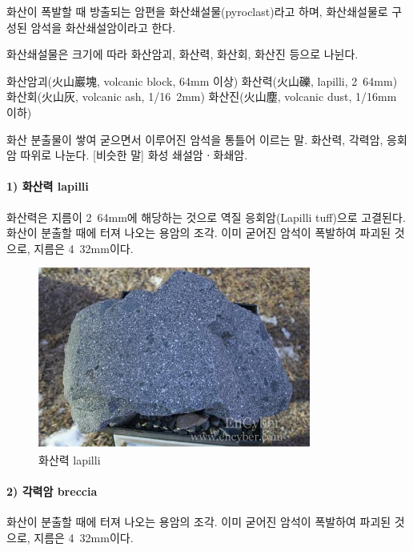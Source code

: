 \documentclass[12pt, a4paper, twoside]{book}
\begin{document}
			화산이 폭발할 때 방출되는 암편을 화산쇄설물(pyroclast)라고 하며, 화산쇄설물로 구성된 암석을 화산쇄설암이라고 한다. 
			
			화산쇄설물은 크기에 따라 화산암괴, 화산력, 화산회, 화산진 등으로 나뉜다. 
			
				화산암괴(火山巖塊, volcanic block, 64mm 이상)
				화산력(火山礫, lapilli, 2~64mm)
				화산회(火山灰, volcanic ash, 1/16~2mm)
				화산진(火山塵, volcanic dust, 1/16mm 이하)
			
			
			화산 분출물이 쌓여 굳으면서 이루어진 암석을 통틀어 이르는 말. 화산력, 각력암, 응회암 따위로 나눈다. [비슷한 말] 화성 쇄설암ㆍ화쇄암.
			
			\paragraph{1) 화산력 lapilli } \tab \tab
			
					화산력은 지름이 2~64mm에 해당하는 것으로 역질 응회암(Lapilli tuff)으로 고결된다. \\
					화산이 분출할 때에 터져 나오는 용암의 조각. 이미 굳어진 암석이 폭발하여 파괴된 것으로, 지름은 4~32mm이다.
					
					\begin{figure}[h]
					\centering
					\caption{화산력 lapilli }
					\includegraphics[width=0.8\textwidth]{./fig/lapilli_0001.jpg}
					\end{figure}
					
			
			\paragraph{2) 각력암 breccia } \tab \tab
			
					화산이 분출할 때에 터져 나오는 용암의 조각. 이미 굳어진 암석이 폭발하여 파괴된 것으로, 지름은 4~32mm이다.
					
\end{document}
